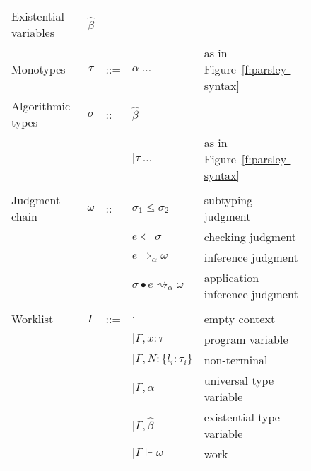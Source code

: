 \documentclass[letterpaper]{article}
\newcommand{\utv}{\alpha}             %
\newcommand{\etv}{\widehat{\beta}}    %
\begin{document}
\begin{figure}
  \begin{tabular}{l c l l l}
    Existential variables     & $\etv$   &     &                                   & \\
    Monotypes                 & $\tau$   & ::= & $ \utv\ \ldots $                  & as in Figure~\ref{f:parsley-syntax} \\
    Algorithmic types         & $\sigma$ & ::= & $ \etv $                          & \\
                              &          &     & $ \mid \tau\ \ldots $             & as in Figure~\ref{f:parsley-syntax} \\
                              &          &     &                                   & \\
    Judgment chain            & $\omega$ & ::= & $ \sigma_1\leq\sigma_2 $          & subtyping judgment \\
                              &          &     & $ e\Leftarrow\sigma $             & checking judgment \\
                              &          &     & $ e\Rightarrow_\utv\omega $       & inference judgment \\
                              &          &     & $ \sigma\bullet e\rightsquigarrow_\utv\omega $ & application inference judgment \\
                              &          &     &                                   & \\
    Worklist                  & $\Gamma$ & ::= & $ \cdot $                         & empty context \\
                              &          &     & $ \mid\Gamma, x: \tau $           & program variable \\
                              &          &     & $ \mid\Gamma, N: \{l_i:\tau_i\} $ & non-terminal \\
                              &          &     & $ \mid\Gamma, \utv $              & universal type variable \\
                              &          &     & $ \mid\Gamma, \etv  $             & existential type variable\\
                              &          &     & $ \mid\Gamma\Vdash\omega $        & work \\


\end{tabular}
\end{figure}
\end{document}
